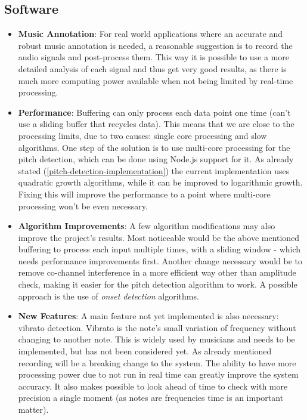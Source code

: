 \subsection{Software}
\begin{itemize}
  \item \textbf{Music Annotation}: For real world applications where an accurate and
  robust music annotation is needed, a reasonable suggestion is to record the audio signals and
  post-process them. This way it is possible to use a more detailed analysis
  of each signal and thus get very good results, as there is much more computing
  power available when not being limited by real-time processing.

  \item \textbf{Performance}: Buffering can only
  process each data point one time (can't use a sliding buffer that recycles data).
  This means that we are close to the processing limits, due to two causes: single
  core processing and slow algorithms. 
  One step of the solution is to use multi-core processing for the pitch detection,
  which can be done using Node.js support for it. 
  As already stated (\autoref{pitch-detection-implementation}) the current implementation
  uses quadratic growth algorithms, while it can be improved to logarithmic
  growth. Fixing this will improve the performance to a point where multi-core processing
  won't be even necessary.

  \item \textbf{Algorithm Improvements}: A few algorithm modifications may also improve the project's results. Most noticeable
  would be the above mentioned buffering to process each input multiple times, with a
  sliding window - which needs performance improvements first.
  Another change necessary would be to remove co-channel interference in a more efficient
  way other than amplitude check, making it easier for the pitch detection algorithm to work.
  A possible approach is the use of \textit{onset detection} algorithms.
  
  \item \textbf{New Features}: A main feature not yet implemented is also necessary: vibrato detection. Vibrato is the
  note's small variation of frequency without changing to another note. This is widely used
  by musicians and needs to be implemented, but has not been considered yet.
  As already mentioned recording will be a breaking change to the system. The ability to have
  more processing power due to not run in real time can greatly improve the system accuracy.
  It also makes possible to look ahead of time to check with more precision a single moment
  (as notes are frequencies time is an important matter).  
\end{itemize}
